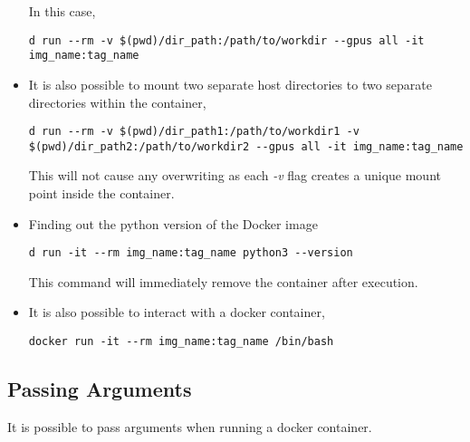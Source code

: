 \documentclass[12pt, a4paper]{scrbook}
\numberwithin{equation}{section}
\theoremstyle{definition}
\theoremstyle{definition}
\begin{document}
\begin{itemize}
		In this case, 
		
		\begin{lstlisting}[style=mystylebash, label=alg:docker_run__mount_dir_rm, xleftmargin=\parindent]
			d run --rm -v $(pwd)/dir_path:/path/to/workdir --gpus all -it img_name:tag_name
		\end{lstlisting}
		
		\item It is also possible to mount two separate host directories to two separate directories within the container,
		
		\begin{lstlisting}[style=mystylebash, label=alg:docker_run__mount_sev_dir_rm, xleftmargin=\parindent]
			d run --rm -v $(pwd)/dir_path1:/path/to/workdir1 -v $(pwd)/dir_path2:/path/to/workdir2 --gpus all -it img_name:tag_name
		\end{lstlisting}
		
		This will not cause any overwriting as each \textit{-v} flag creates a unique mount point inside the container. 
		
		\item Finding out the python version of the Docker image
		
		\begin{lstlisting}[style=mystylebash, label=alg:docker__python_version, xleftmargin=\parindent]
			d run -it --rm img_name:tag_name python3 --version
		\end{lstlisting}
		
		This command will immediately remove the container after execution. 
		
		\item It is also possible to interact with a docker container,
		
		\begin{lstlisting}[style=mystylebash, label=alg:docker_interactive_bash, xleftmargin=\parindent]
			docker run -it --rm img_name:tag_name /bin/bash
		\end{lstlisting}
		
	\end{itemize}
	
	\subsection{Passing Arguments}
	
	It is possible to pass arguments when running a docker container. 
	
\end{document}
